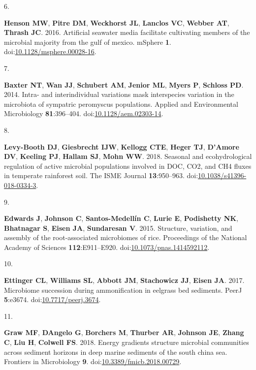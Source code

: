 \documentclass[
]{article}
\newlength{\cslhangindent}
\newlength{\csllabelwidth}
\newlength{\cslentryspacingunit} %
\newenvironment{CSLReferences}[2] %
 {%
  \setlength{\parindent}{0pt}
  \ifodd #1
  \let\oldpar\par
  \def\par{\hangindent=\cslhangindent\oldpar}
  \fi
  \setlength{\parskip}{#2\cslentryspacingunit}
 }%
 {}
\newcommand{\CSLLeftMargin}[1]{\parbox[t]{\csllabelwidth}{#1}}
\newcommand{\CSLRightInline}[1]{\parbox[t]{\linewidth - \csllabelwidth}{#1}\break}
\begin{document}
\begin{CSLReferences}{0}{1}
\leavevmode{}%
\CSLLeftMargin{6. }%
\CSLRightInline{\textbf{Henson MW}, \textbf{Pitre DM}, \textbf{Weckhorst
JL}, \textbf{Lanclos VC}, \textbf{Webber AT}, \textbf{Thrash JC}. 2016.
Artificial seawater media facilitate cultivating members of the
microbial majority from the gulf of mexico. {mSphere} \textbf{1}.
doi:\href{https://doi.org/10.1128/msphere.00028-16}{10.1128/msphere.00028-16}.}

\leavevmode{}%
\CSLLeftMargin{7. }%
\CSLRightInline{\textbf{Baxter NT}, \textbf{Wan JJ}, \textbf{Schubert
AM}, \textbf{Jenior ML}, \textbf{Myers P}, \textbf{Schloss PD}. 2014.
Intra- and interindividual variations mask interspecies variation in the
microbiota of sympatric peromyscus populations. Applied and
Environmental Microbiology \textbf{81}:396--404.
doi:\href{https://doi.org/10.1128/aem.02303-14}{10.1128/aem.02303-14}.}

\leavevmode{}%
\CSLLeftMargin{8. }%
\CSLRightInline{\textbf{Levy-Booth DJ}, \textbf{Giesbrecht IJW},
\textbf{Kellogg CTE}, \textbf{Heger TJ}, \textbf{D'Amore DV},
\textbf{Keeling PJ}, \textbf{Hallam SJ}, \textbf{Mohn WW}. 2018.
Seasonal and ecohydrological regulation of active microbial populations
involved in {DOC}, {CO}2, and {CH}4 fluxes in temperate rainforest soil.
The {ISME} Journal \textbf{13}:950--963.
doi:\href{https://doi.org/10.1038/s41396-018-0334-3}{10.1038/s41396-018-0334-3}.}

\leavevmode{}%
\CSLLeftMargin{9. }%
\CSLRightInline{\textbf{Edwards J}, \textbf{Johnson C},
\textbf{Santos-Medellín C}, \textbf{Lurie E}, \textbf{Podishetty NK},
\textbf{Bhatnagar S}, \textbf{Eisen JA}, \textbf{Sundaresan V}. 2015.
Structure, variation, and assembly of the root-associated microbiomes of
rice. Proceedings of the National Academy of Sciences
\textbf{112}:E911--E920.
doi:\href{https://doi.org/10.1073/pnas.1414592112}{10.1073/pnas.1414592112}.}

\leavevmode{}%
\CSLLeftMargin{10. }%
\CSLRightInline{\textbf{Ettinger CL}, \textbf{Williams SL},
\textbf{Abbott JM}, \textbf{Stachowicz JJ}, \textbf{Eisen JA}. 2017.
Microbiome succession during ammonification in eelgrass bed sediments.
{PeerJ} \textbf{5}:e3674.
doi:\href{https://doi.org/10.7717/peerj.3674}{10.7717/peerj.3674}.}

\leavevmode{}%
\CSLLeftMargin{11. }%
\CSLRightInline{\textbf{Graw MF}, \textbf{DAngelo G}, \textbf{Borchers
M}, \textbf{Thurber AR}, \textbf{Johnson JE}, \textbf{Zhang C},
\textbf{Liu H}, \textbf{Colwell FS}. 2018. Energy gradients structure
microbial communities across sediment horizons in deep marine sediments
of the south china sea. Frontiers in Microbiology \textbf{9}.
doi:\href{https://doi.org/10.3389/fmicb.2018.00729}{10.3389/fmicb.2018.00729}.}


\end{CSLReferences}
\end{document}
